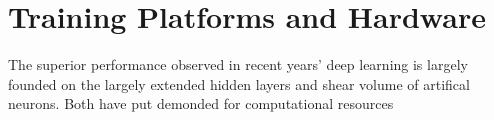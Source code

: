 \section{Training Platforms and Hardware}
The superior performance observed in recent years' deep learning is largely founded on the largely extended hidden layers and shear volume of artifical neurons. Both have put demonded for computational resources 